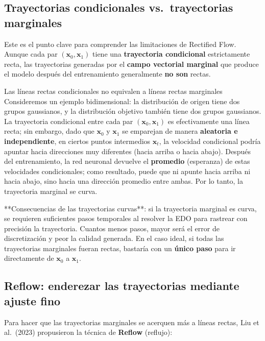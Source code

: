 \subsection{Trayectorias condicionales vs.\ trayectorias marginales}

Este es el punto clave para comprender las limitaciones de Rectified Flow. Aunque cada par $(\mathbf{x}_0, \mathbf{x}_1)$ tiene una \textbf{trayectoria condicional} estrictamente recta, las trayectorias generadas por el \textbf{campo vectorial marginal} que produce el modelo después del entrenamiento generalmente \textbf{no son} rectas.

\begin{warningbox}{Las líneas rectas condicionales no equivalen a líneas rectas marginales}
Consideremos un ejemplo bidimensional: la distribución de origen tiene dos grupos gaussianos, y la distribución objetivo también tiene dos grupos gaussianos. La trayectoria condicional entre cada par $(\mathbf{x}_0, \mathbf{x}_1)$ es efectivamente una línea recta; sin embargo, dado que $\mathbf{x}_0$ y $\mathbf{x}_1$ se emparejan de manera \textbf{aleatoria e independiente}, en ciertos puntos intermedios $\mathbf{x}_t$, la velocidad condicional podría apuntar hacia direcciones muy diferentes (hacia arriba o hacia abajo). Después del entrenamiento, la red neuronal devuelve el \textbf{promedio} (esperanza) de estas velocidades condicionales; como resultado, puede que ni apunte hacia arriba ni hacia abajo, sino hacia una dirección promedio entre ambas. Por lo tanto, la trayectoria marginal se curva.
\end{warningbox}

**Consecuencias de las trayectorias curvas**: si la trayectoria marginal es curva, se requieren suficientes pasos temporales al resolver la EDO para rastrear con precisión la trayectoria. Cuantos menos pasos, mayor será el error de discretización y peor la calidad generada. En el caso ideal, si todas las trayectorias marginales fueran rectas, bastaría con un \textbf{único paso} para ir directamente de $\mathbf{x}_0$ a $\mathbf{x}_1$.

\subsection{Reflow: enderezar las trayectorias mediante ajuste fino}

Para hacer que las trayectorias marginales se acerquen más a líneas rectas, Liu et al.\ (2023) propusieron la técnica de \textbf{Reflow} (reflujo):

